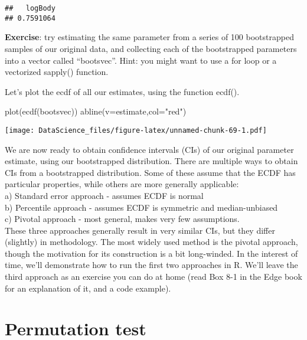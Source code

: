 \documentclass[
]{book}
\newenvironment{Shaded}{\begin{snugshade}}{\end{snugshade}}
\newcommand{\AttributeTok}[1]{\textcolor[rgb]{0.77,0.63,0.00}{#1}}
\newcommand{\FunctionTok}[1]{\textcolor[rgb]{0.00,0.00,0.00}{#1}}
\newcommand{\NormalTok}[1]{#1}
\newcommand{\StringTok}[1]{\textcolor[rgb]{0.31,0.60,0.02}{#1}}
\begin{document}
\begin{verbatim}
##   logBody 
## 0.7591064
\end{verbatim}

\textbf{Exercise}: try estimating the same parameter from a series of 100 bootstrapped samples of our original data, and collecting each of the bootstrapped parameters into a vector called ``bootsvec''. Hint: you might want to use a for loop or a vectorized sapply() function.

Let's plot the ecdf of all our estimates, using the function ecdf().

\begin{Shaded}
\begin{Highlighting}[]
\FunctionTok{plot}\NormalTok{(}\FunctionTok{ecdf}\NormalTok{(bootsvec))}
\FunctionTok{abline}\NormalTok{(}\AttributeTok{v=}\NormalTok{estimate,}\AttributeTok{col=}\StringTok{"red"}\NormalTok{)}
\end{Highlighting}
\end{Shaded}

\texttt{[image: DataScience\_files/figure-latex/unnamed-chunk-69-1.pdf]}

We are now ready to obtain confidence intervals (CIs) of our original parameter estimate, using our bootstrapped distribution. There are multiple ways to obtain CIs from a bootstrapped distribution. Some of these assume that the ECDF has particular properties, while others are more generally applicable:\\
a) Standard error approach - assumes ECDF is normal\\
b) Percentile approach - assumes ECDF is symmetric and median-unbiased\\
c) Pivotal approach - most general, makes very few assumptions.\\
These three approaches generally result in very similar CIs, but they differ (slightly) in methodology. The most widely used method is the pivotal approach, though the motivation for its construction is a bit long-winded. In the interest of time, we'll demonstrate how to run the first two approaches in R. We'll leave the third approach as an exercise you can do at home (read Box 8-1 in the Edge book for an explanation of it, and a code example).

\hypertarget{permutation-test}{%
\section{Permutation test}\label{permutation-test}}
\end{document}
